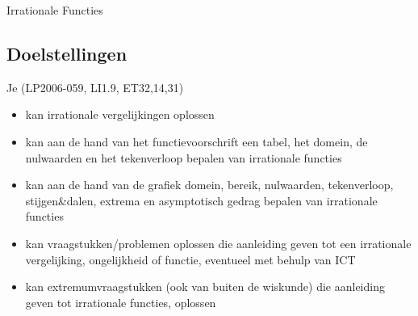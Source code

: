 \documentclass[12pt,twoside]{article}
\begin{document}
\begin{center}
  \begin{mdframed}
    \centering
    \fontsize{40}{60}\selectfont Irrationale Functies
  \end{mdframed}
  \vfill
  \vfill
\end{center}

\subsection*{Doelstellingen}
\vspace*{-0.8cm}
\begin{singlespacing}
  Je \hfill  {\scriptsize(LP2006-059, LI1.9, ET32,14,31)}
  \begin{itemize}
    \itemsep-0.2em
  \item kan irrationale vergelijkingen oplossen
  \item kan aan de hand van het functievoorschrift een tabel, het domein, de nulwaarden en het tekenverloop bepalen van irrationale functies
  \item kan aan de hand van de grafiek domein, bereik, nulwaarden, tekenverloop, stijgen\&dalen, extrema en asymptotisch gedrag bepalen van irrationale functies
  \item kan vraagstukken/problemen oplossen die aanleiding geven tot een irrationale vergelijking, ongelijkheid of functie, eventueel met behulp van ICT
  \item kan extremumvraagstukken (ook van buiten de wiskunde) die aanleiding geven tot irrationale functies, oplossen
  \end{itemize}
\end{singlespacing}
\end{document}
